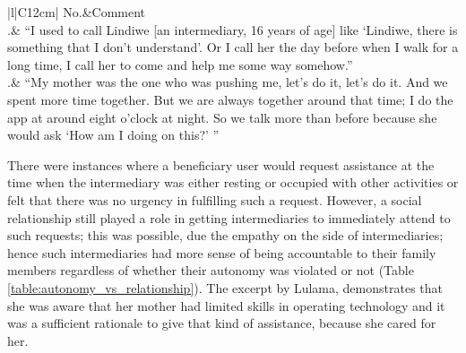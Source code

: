 \begin{table}[h!]
\renewcommand{\baselinestretch}{1.5}
  \begin{center}
    \caption{Excerpts: examples of how a good prior social relationship gave an advantage to beneficiaries when negotiating for intermediated use.}
    \label{table:negotiations}
	\begin{tabular}{|l|C{12cm}|}
		\hline
		No.&Comment\\
		.& {``I used to call Lindiwe [an intermediary, 16 years of age] like `Lindiwe, there is something that I don't understand'. Or I call her the day before when I walk for a long time, I call her to come and help me some way somehow.''} \\
		.& {``My mother was the one who was pushing me, let’s do it, let’s do it. And we spent more time together. But we are always together around that time; I do the app at around eight o'clock at night. So we talk more than before because she would ask `How am I doing on this?' ''}\\
		\hline
	\end{tabular}
  \end{center}
\end{table} 

There were instances where a beneficiary user would request assistance at the time when the intermediary was either resting or occupied with other activities or felt that there was no urgency in fulfilling such a request. However, a social relationship still played a role in getting intermediaries to immediately attend to such requests; this was possible, due the empathy on the side of intermediaries; hence such intermediaries had more sense of being accountable to their family members regardless of whether their autonomy was violated or not (Table \ref{table:autonomy_vs_relationship}). The excerpt by Lulama, demonstrates that she was aware that her mother had limited skills in operating technology and it was a sufficient rationale to give that kind of assistance, because she cared for her. 

